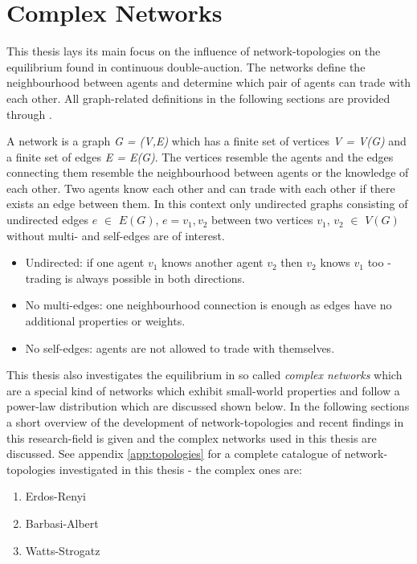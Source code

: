 \documentclass[../Bachelorarbeit.tex]{subfiles}
\begin{document}
\graphicspath{{./figures/theory/nw/}}	%

\section{Complex Networks}
\label{sec:theory_complexNetworks}
This thesis lays its main focus on the influence of network-topologies on the equilibrium found in continuous double-auction. The networks define the neighbourhood between agents and determine which pair of agents can trade with each other. All graph-related definitions in the following sections are provided through \cite{Drmota2007}.

\medskip

A network is a graph \textit{G = (V,E)} which has a finite set of vertices \textit{V = V(G)} and a finite set of edges \textit{E = E(G)}. The vertices resemble the agents and the edges connecting them resemble the neighbourhood between agents or the knowledge of each other. Two agents know each other and can trade with each other if there exists an edge between them. In this context only undirected graphs consisting of undirected edges $e$ $\in$ $E(G)$, $e = {v_1, v_2}$ between two vertices $v_1$, $v_2$ $\in$ $V(G)$ without multi- and self-edges are of interest.

\begin{itemize}
\item Undirected: if one agent $v_1$ knows another agent $v_2$ then $v_2$ knows $v_1$ too - trading is always possible in both directions.
\item No multi-edges: one neighbourhood connection is enough as edges have no additional properties or weights.
\item No self-edges: agents are not allowed to trade with themselves.
\end{itemize}

This thesis also investigates the equilibrium in so called \textit{complex networks} which are a special kind of networks which exhibit small-world properties and follow a power-law distribution which are discussed shown below. In the following sections a short overview of the development of network-topologies and recent findings in this research-field is given and the complex networks used in this thesis are discussed. See appendix \ref{app:topologies} for a complete catalogue of network-topologies investigated in this thesis - the complex ones are:

\begin{enumerate}
\item Erdos-Renyi
\item Barbasi-Albert
\item Watts-Strogatz
\end{enumerate}
\end{document}
